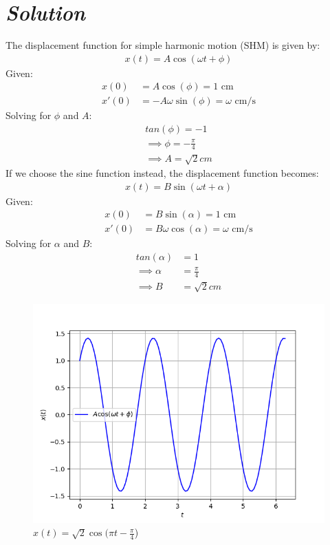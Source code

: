\documentclass[journal,12pt,twocolumn]{IEEEtran}
\theoremstyle{remark}
\begin{document}
\section*{\textit{\textbf{Solution}}}

The displacement function for simple harmonic motion (SHM) is given by:
\begin{align}
   x(t) = A \cos(\omega t + \phi)  
\end{align}
Given:
\begin{align}
     x(0)&= A \cos(\phi) = 1 \text{ cm} \\
 x'(0)&= -A \omega \sin(\phi) = \omega \text{ cm/s} \label{eq:3}
 \end{align}
Solving for $\phi$ and $A$:
\begin{align}
    tan(\phi) = -1\\
\implies
\phi = -\frac{\pi}{4} \\
\implies 
A= \sqrt{2}cm
\end{align}
If we choose the sine function instead, the displacement function becomes:
\begin{align}
    x(t) = B \sin(\omega t + \alpha) 
    \end{align}
    Given:\\
    \begin{align}
	    x(0)&=B \sin(\alpha) = 1 \text{ cm} \\
	    x'(0)&=B \omega \cos(\alpha) = \omega \text{ cm/s}\label{eq;11}
\end{align}
Solving for $\alpha$ and $B$:
\begin{align}
    tan(\alpha)& = 1\\
\implies
\alpha &= \frac{\pi}{4} \\
\implies 
B &=\sqrt{2}cm
\end{align}
\begin{figure}[h]
\renewcommand\thefigure{1}
    \centering
    \includegraphics[width=0.8\columnwidth]{figs/fig1.png}
    \caption{$x(t) = \sqrt{2}\cos(\pi t - \frac{\pi}{4}$)}
    \label{Fig1}
\end{figure}
\end{document}
